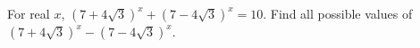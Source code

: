 For real $ x $, $(7+4\sqrt3)^x+(7-4\sqrt3)^x=10 $. Find all possible values of $(7+4\sqrt3)^x-(7-4\sqrt3)^x $.

